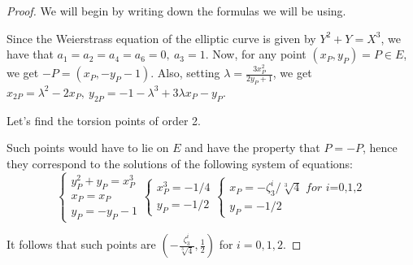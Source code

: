\documentclass{article}
\begin{document}
\begin{proof}
    We will begin by writing down the formulas we will be using.

    Since the Weierstrass equation of the elliptic curve is given by
    $Y^2+Y=X^3$, we have that $a_1=a_2=a_4=a_6=0,\ a_3=1$. Now, for any point
    $(x_P,y_P)=P\in E$, we get $-P=(x_P,-y_P-1)$. Also, setting
    $\lambda=\frac{3x_P^2}{2y_P+1}$, we get $x_{2P}=\lambda^2-2x_P,\
    y_{2P}=-1-\lambda^3+3\lambda x_P-y_P$.

    Let's find the torsion points of order 2.

    Such points would have to lie on $E$ and have the property that $P=-P$,
    hence they correspond to the solutions of the following system of equations:
    \[
        \begin{cases}
            y_P^2+y_P=x_P^3 \\
            x_P=x_P \\
            y_P=-y_P-1
        \end{cases}
        \begin{cases}
            x_P^3=-1/4 \\
            y_P=-1/2
        \end{cases}
        \begin{cases}
            x_P=-\zeta_3^i/\sqrt[3]{4}\textit{ for i=0,1,2} \\
            y_P=-1/2
        \end{cases}
    \]
    
    It follows that such points are $(-\frac{\zeta_3^i}{\sqrt[3]{4}},\frac{1}{2})$ for
    $i=0,1,2$.


\end{proof}
\end{document}

